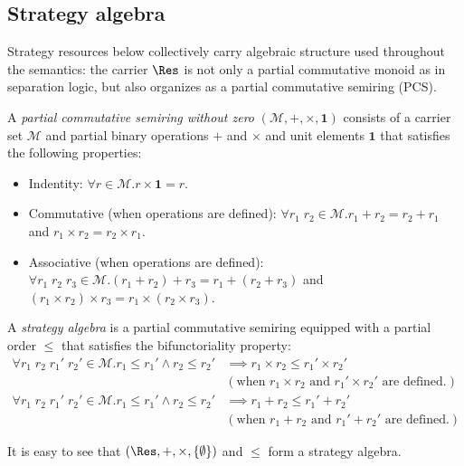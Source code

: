 \subsection{Strategy algebra}

Strategy resources below collectively carry algebraic structure used throughout the semantics: the carrier $\Res$ is not only a partial commutative monoid as in separation logic, but also organizes as a partial commutative semiring (PCS).

\begin{definition}\label{def:strategy-semiring}
  A \emph{partial commutative semiring without zero}
  $(\mathcal{M},{+},{\times},\mathbf{1})$ consists of a carrier set $\mathcal{M}$ and partial binary operations ${+}$ and ${\times}$ and unit elements $\mathbf{1}$ that satisfies the following properties:
  \begin{itemize}
  \item Indentity: $\forall r \in \mathcal{M}. r \times \mathbf{1} = r$.
  \item Commutative (when operations are defined): $\forall r_1\;r_2 \in \mathcal{M}. r_1 + r_2 = r_2 + r_1$ and $r_1 \times r_2 = r_2 \times r_1$.
  \item Associative (when operations are defined): $\forall r_1\;r_2\;r_3 \in \mathcal{M}. (r_1 + r_2) + r_3 = r_1 + (r_2 + r_3)$ and $(r_1 \times r_2) \times r_3 = r_1 \times (r_2 \times r_3)$.
  \end{itemize}
A \emph{strategy algebra} is a partial commutative semiring equipped with a partial order $\leq$ that satisfies the bifunctoriality property:
  \begin{align*}
    \forall r_1\;r_2\;r_1'\;r_2' \in \mathcal{M}. r_1 \leq r_1' \land r_2 \leq r_2' &\implies r_1 \times r_2 \leq r_1' \times r_2' 
    \\& (\text{when } r_1 \times r_2 \text{ and } r_1' \times r_2' \text{ are defined.})
    \\\forall r_1\;r_2\;r_1'\;r_2' \in \mathcal{M}. r_1 \leq r_1' \land r_2 \leq r_2' &\implies r_1 + r_2 \leq r_1' + r_2' 
    \\& (\text{when } r_1 + r_2 \text{ and } r_1' + r_2' \text{ are defined.})
  \end{align*}
  \end{definition}

It is easy to see that $(\Res,{+},{\times},\{ \emptyset \})$ and $\leq$ form a strategy algebra.

